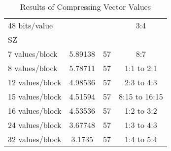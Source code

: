 \begin{table}
\begin{tabular}{l|S|r|c}
			\hspace{6mm} 48 bits/value & & & 3:4 \\
		SZ & & & \\
		\hspace{3mm} 7 values/block & 5.89138 & 57 & 8:7 \\
		\hspace{3mm} 8 values/block & 5.78711 & 57 & 1:1 to 2:1 \\
		\hspace{3mm} 12 values/block & 4.98536 & 57 & 2:3 to 4:3 \\
		\hspace{3mm} 15 values/block & 4.51594 & 57 & 8:15 to 16:15 \\
		\hspace{3mm} 16 values/block & 4.53536 & 57 & 1:2 to 3:2 \\
		\hspace{3mm} 24 values/block & 3.67748 & 57 & 1:3 to 4:3\\
		\hspace{3mm} 32 values/block & 3.1735 & 57 & 1:4 to 5:4\\
	\end{tabular}
	\caption{Results of Compressing Vector Values}
	\label{tab:results-vec}
\end{table}

